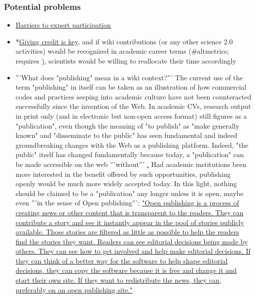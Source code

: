 \documentclass[final,authoryear,3p]{elsarticle-open-drafting}
\begin{document}
\subsubsection{Potential problems}
\begin{itemize}
	\item \href{http://wikimania2011.wikimedia.org/wiki/Submissions/Barriers_and_opportunities_for_expert_participation_in_Wikipedia:_Results_from_a_survey}{Barriers to expert participation}
	\item *\href{http://cameronneylon.net/blog/michael-nielsen-the-credit-economy-and-open-science/}{Giving credit is key}, and if wiki contributions (or any other science 2.0 activities) would be recognized in academic career terms (\#altmetrics; requires \href{http://marciovm.com/michael-nielsen-on-the-future-of-science functional reputation systems}), scientists would be willing to reallocate their time accordingly


	\item '''What does "publishing" mean in a wiki context?''' The current use of the term "publishing" in itself can be taken as an illustration of how commercial codes and practices seeping into academic culture have not been counteracted successfully since the invention of the Web. In academic CVs, research output in print only (and in electronic but non-open access format) still figures as a "publication", even though the meaning of "to publish" as "make generally known" and "disseminate to the public" has seen fundamental and indeed groundbreaking changes with the Web as a publishing platform. Indeed, "the public" itself has changed fundamentally because today, a "publication" can be made accessible on the web '''without''' \href{http://scientopia.org/blogs/bookoftrogool/2010/03/15/battle-of-the-opens/ "a subscription, per-article, or other fee ... by the reader or the reader's proxy (e.g. a library)"}. Had academic institutions been more interested in the benefit offered by such opportunities, publishing openly would be much more widely accepted today. In this light, nothing should be claimed to be a "publication" any longer unless it is open, maybe even '''in the sense of Open publishing''': \href{http://en.wikipedia.org/w/index.php?title=Special:Cite&page=Open_publishing&id=383242580}{"Open publishing is a process of creating news or other content that is transparent to the readers. They can contribute a story and see it instantly appear in the pool of stories publicly available. Those stories are filtered as little as possible to help the readers find the stories they want. Readers can see editorial decisions being made by others. They can see how to get involved and help make editorial decisions. If they can think of a better way for the software to help shape editorial decisions, they can copy the software because it is free and change it and start their own site. If they want to redistribute the news, they can, preferably on an open publishing site."}
\end{itemize}
\end{document}
